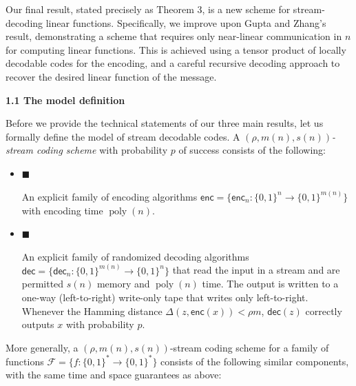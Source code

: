 Our final result, stated precisely as Theorem 3, is a new scheme for stream-decoding linear functions. Specifically, we improve upon Gupta and Zhang’s result, demonstrating a scheme that requires only near-linear communication in $n$ for computing linear functions. This is achieved using a tensor product of locally decodable codes for the encoding, and a careful recursive decoding approach to recover the desired linear function of the message.\par





\par\medskip\noindent\textbf{
1.1 The model definition}\par




Before we provide the technical statements of our three main results, let us formally define the model of stream decodable codes. A \emph{$(\rho,m(n),s(n))$-stream coding scheme} with probability $p$ of success consists of the following:\par


\begin{itemize}


\item[] 
$\blacksquare$ 


An explicit family of encoding algorithms $\mathsf{enc}=\{\mathsf{enc}_{n}:\{0,1\}^{n}\rightarrow\{0,1\}^{m(n)}\}$ with encoding time $\operatorname{poly}(n)$.\par





\item[] 
$\blacksquare$ 


An explicit family of randomized decoding algorithms $\mathsf{dec}=\{\mathsf{dec}_{n}:\{0,1\}^{m(n)}\rightarrow\{0,1\}^{n}\}$ that read the input in a stream and are permitted $s(n)$ memory and $\operatorname{poly}(n)$ time. The output is written to a one-way (left-to-right) write-only tape that writes only left-to-right. Whenever the Hamming distance $\Delta(z,\mathsf{enc}(x))<\rho m$, $\mathsf{dec}(z)$ correctly outputs $x$ with probability $p$.\par





\end{itemize}




More generally, a $(\rho,m(n),s(n))$-stream coding scheme for a family of functions $\mathcal{F}=\{f:\{0,1\}^{*}\to\{0,1\}^{*}\}$ consists of the following similar components, with the same time and space guarantees as above:\par


